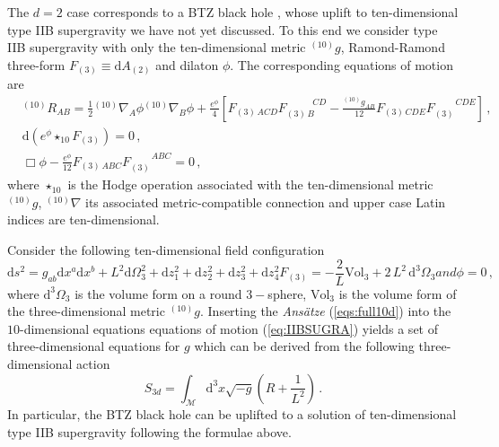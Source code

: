\documentclass[11pt]{article}
\begin{document}
The $d=2$ case corresponds to a BTZ black hole \cite{Banados:1992wn}, whose uplift to ten-dimensional type IIB supergravity we have not yet discussed. To this end we consider type IIB supergravity with only the ten-dimensional metric ${}^{(10)}g$, Ramond-Ramond three-form $F_{(3)} \equiv \mathrm{d}A_{(2)}$ and dilaton $\phi$. The corresponding equations of motion are
\begin{subequations}
\begin{align}
& {}^{(10)}R_{AB} = \frac{1}{2}{}^{(10)}\nabla_A\phi{}^{(10)}\nabla_B\phi+\frac{e^\phi}{4}\left[F_{(3)\,ACD}F_{(3)\,B}^{\phantom{(3)B}CD}-\frac{{}^{(10)}g_{AB}}{12}F_{(3)\,CDE}F_{(3)}^{\phantom{(3)}\,CDE}\right]\,,
\\
& \mathrm{d}\left(e^{\phi}\star_{10} F_{(3)}\right)=0\,,
\\
&\Box \phi-\frac{e^{\phi}}{12} F_{(3)\,ABC}F_{(3)}^{\phantom{(3)}\,ABC}=0\,,
\end{align}
\label{eq:IIBSUGRA}%
\end{subequations}%
where $\star_{10}$ is the Hodge operation associated with the ten-dimensional metric ${}^{(10)}g$, ${}^{(10)}\nabla$ its associated metric-compatible connection and upper case Latin indices are ten-dimensional.

Consider the following ten-dimensional field configuration
\begin{subequations}
\begin{equation}
\mathrm{d}s^2 = g_{ab}\mathrm{d}x^a\mathrm{d}x^b+L^2 \mathrm{d}\Omega_3^2+\mathrm{d}z_1^2+\mathrm{d}z_2^2+\mathrm{d}z_3^2+\mathrm{d}z_4^2
\end{equation}
\begin{equation}
F_{(3)} = -\frac{2}{L}\mathrm{Vol}_{3}+2\,L^2\,\mathrm{d}^3\Omega_3
\end{equation}
and
\begin{equation}
\phi = 0\, ,
\end{equation}
\label{eqs:full10d}%
\end{subequations}%
where $\mathrm{d}^3\Omega_3$ is the volume form on a round $3-$sphere, $\mathrm{Vol}_{3}$ is the volume form of the three-dimensional metric ${}^{(10)}g$.  Inserting the \emph{Ans\"atze} (\ref{eqs:full10d}) into the $10$-dimensional equations equations of motion (\ref{eq:IIBSUGRA}) yields a set of three-dimensional equations for $g$ which can be derived from the following three-dimensional action
\begin{equation}
S_{3d} = \int_{\mathcal{M}}\mathrm{d}^3 x\sqrt{-g}\left(R+\frac{1}{L^2}\right)\,.
\label{eq:add}
\end{equation}
In particular, the BTZ black hole can be uplifted to a solution of ten-dimensional type IIB supergravity following the formulae above.
\end{document}
